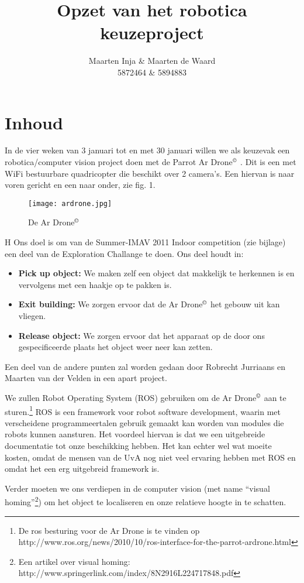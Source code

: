 \documentclass[a4paper,10pt]{article}
\title{Opzet van het robotica keuzeproject}
\author{Maarten Inja \& Maarten de Waard\\\small 5872464 \& 5894883}
\newcommand{\Ardrone}{Ar Drone$^{\copyright}$ }
\begin{document}
\maketitle

\section{Inhoud}
In de vier weken van 3 januari tot en met 30 januari willen we als keuzevak een robotica/computer vision project doen met de Parrot \Ardrone. Dit is een met WiFi bestuurbare quadricopter die beschikt over 2 camera's. Een hiervan is naar voren gericht en een naar onder, zie fig. 1.
\begin{figure}
 \centering
 \texttt{[image: ardrone.jpg]}
 \caption{De \Ardrone}
\end{figure}
H
Ons doel is om van de Summer-IMAV 2011 Indoor competition (zie bijlage) een deel van de Exploration Challange te doen. Ons deel houdt in:
\begin{itemize}
\item[]\textbf{Pick up object:} We maken zelf een object dat makkelijk te herkennen is en vervolgens met een haakje op te pakken is.
\item[]\textbf{Exit building:} We zorgen ervoor dat de \Ardrone het gebouw uit kan vliegen.
\item[]\textbf{Release object:} We zorgen ervoor dat het apparaat op de door ons gespecificeerde plaats het object weer neer kan zetten.
\end{itemize}
Een deel van de andere punten zal worden gedaan door Robrecht Jurriaans en Maarten van der Velden in een apart project.

We zullen Robot Operating System (ROS) gebruiken om de \Ardrone aan te sturen.\footnote{De ros besturing voor de Ar Drone is te vinden op http://www.ros.org/news/2010/10/ros-interface-for-the-parrot-ardrone.html} ROS is een framework voor robot software development, waarin met verscheidene programmeertalen gebruik gemaakt kan worden van modules die robots kunnen aansturen. Het voordeel hiervan is dat we een uitgebreide documentatie tot onze beschikking hebben. Het kan echter wel wat moeite kosten, omdat de mensen van de UvA nog niet veel ervaring hebben met ROS en omdat het een erg uitgebreid framework is.

Verder moeten we ons verdiepen in de computer vision (met name ``visual homing''\footnote{Een artikel over visual homing: http://www.springerlink.com/index/8N2916L224717848.pdf}) om het object te localiseren en onze relatieve hoogte in te schatten.
\end{document}
